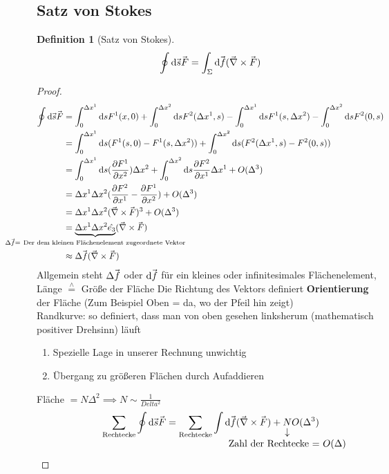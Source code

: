 \documentclass[a4paper]{scrartcl}
\newcommand{\estimates}{\overset{\scriptscriptstyle\wedge}{=}}
\renewcommand{\d}{\mathrm{d}}
\renewcommand{\v}[1]{\mathrlap{\vec{\mkern-2mu\phantom{#1}}}#1}
\theoremstyle{definition}
\newtheorem{defn}{Definition}
\theoremstyle{plain}
\theoremstyle{remark}
\theoremstyle{remark}
\begin{document}
\subsection{Satz von Stokes}
\label{sec-4-5}
\begin{defn}[Satz von Stokes]
\[\oint \d \v s\v F = \int_{\Sigma} \d \v f (\v \nabla \times \v F)\]
\end{defn}
\begin{proof}
\begin{align*}
\oint \d\v s\v F &= \int_0^{\Delta x^1}\d s F^1(x,0) + \int_0^{\Delta x^2}\d s F^2(\Delta x^1, s) - \int_0^{\Delta x^1}\d s F^1(s, \Delta x^2) - \int_0^{\Delta x^2}\d s F^2(0,s) \\
&= \int_0^{\Delta x^1}\d s(F^1(s,0) - F^1(s,\Delta x^2)) + \int_0^{\Delta x^2}\d s(F^2(\Delta x^1, s) - F^2(0,s)) \\
&= \int_0^{\Delta x^1}\d s(\frac{\partial F^1}{\partial x^2})\Delta x^2 + \int_0^{\Delta x^2}\d s \frac{\partial F^2}{\partial x^1}\Delta x^1 + O(\Delta^3) \\
&= \Delta x^1 \Delta x^2(\frac{\partial F^2}{\partial x^1} - \frac{\partial F^1}{\partial x^2}) + O(\Delta^3) \\
&= \Delta x^1 \Delta x^2(\v\nabla \times \v F)^3 + O(\Delta^3) \\
&= \underbrace{\Delta x^1 \Delta x^2 \hat{e_3}}_{\mathclap{\Delta \v f = ~\text{Der dem kleinen Flächenelement zugeordnete Vektor}}} (\v\nabla \times \v F) \\
&\approx \Delta \v f(\v \nabla \times \v F)
\end{align*}
Allgemein steht $\Delta \v f$ oder $\d \v f$ für ein kleines oder infinitesimales Flächenelement, Länge $\estimates$ Größe der Fläche
Die Richtung des Vektors definiert \textbf{Orientierung} der Fläche (Zum Beispiel Oben = da, wo der Pfeil hin zeigt) \\
   Randkurve: so definiert, dass man von oben gesehen linksherum (mathematisch positiver Drehsinn) läuft
\begin{enumerate}
\item Spezielle Lage in unserer Rechnung unwichtig
\item Übergang zu größeren Flächen durch Aufaddieren
\end{enumerate}
Fläche $= N\Delta ^2 \implies N\sim \frac{1}{Delta^2}$
\begin{align*}
\sum_{\text{Rechtecke}} \oint\d \v s\v F = \sum_{\text{Rechtecke}} \int\d\v f(\v\nabla \times \v F) + \underarrow[N]{Zahl der Rechtecke = $O(\Delta)$} O(\Delta^3) \\

\end{align*}
\end{proof}
\end{document}
